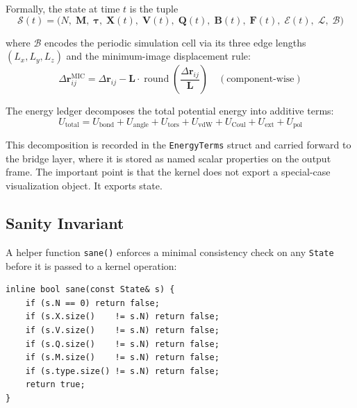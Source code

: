 ﻿\documentclass[11pt]{article}
\newcommand{\type}[1]{\texttt{#1}}
\newcommand{\op}[1]{\texttt{#1}}
\begin{document}
Formally, the state at time $t$ is the tuple
\begin{equation}
  \mathcal{S}(t) = \bigl(N,\; \mathbf{M},\; \boldsymbol{\tau},\;
                         \mathbf{X}(t),\; \mathbf{V}(t),\; \mathbf{Q}(t),\;
                         \mathbf{B}(t),\; \mathbf{F}(t),\; \mathcal{E}(t),\;
                         \mathcal{L},\; \mathcal{B}\bigr)
\end{equation}

where $\mathcal{B}$ encodes the periodic simulation cell via its three edge
lengths $(L_x, L_y, L_z)$ and the minimum-image displacement rule:
\begin{equation}
  \Delta\mathbf{r}_{ij}^{\text{MIC}}
    = \Delta\mathbf{r}_{ij}
    - \mathbf{L} \cdot \operatorname{round}\!\left(
        \frac{\Delta\mathbf{r}_{ij}}{\mathbf{L}}\right)
  \quad (\text{component-wise})
\end{equation}

The energy ledger decomposes the total potential energy into additive terms:
\begin{equation}
  U_{\mathrm{total}} = U_{\mathrm{bond}}
                      + U_{\mathrm{angle}}
                      + U_{\mathrm{tors}}
                      + U_{\mathrm{vdW}}
                      + U_{\mathrm{Coul}}
                      + U_{\mathrm{ext}}
                      + U_{\mathrm{pol}}
\end{equation}

This decomposition is recorded in the \type{EnergyTerms} struct and carried
forward to the bridge layer, where it is stored as named scalar properties on
the output frame. The important point is that the kernel does not export a
special-case visualization object. It exports state.

\subsection{Sanity Invariant}

A helper function \op{sane()} enforces a minimal consistency check on any
\type{State} before it is passed to a kernel operation:

\begin{lstlisting}
inline bool sane(const State& s) {
    if (s.N == 0) return false;
    if (s.X.size()    != s.N) return false;
    if (s.V.size()    != s.N) return false;
    if (s.Q.size()    != s.N) return false;
    if (s.M.size()    != s.N) return false;
    if (s.type.size() != s.N) return false;
    return true;
}
\end{lstlisting}
\end{document}
